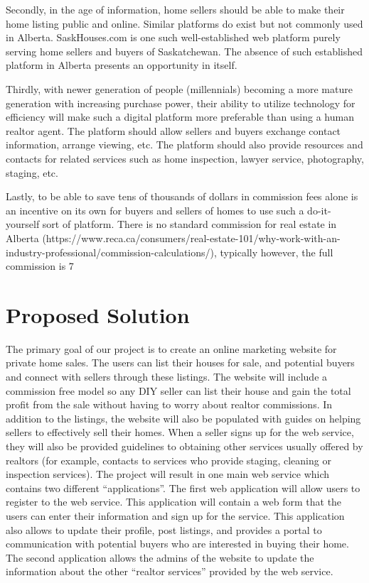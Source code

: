 \documentclass[letterpaper,12pt]{article}
\begin{document}
Secondly, in the age of information, home sellers should be able to make their home listing public and online. Similar platforms do exist but not commonly used in Alberta. SaskHouses.com is one such well-established web platform purely serving home sellers and buyers of Saskatchewan. The absence of such established platform in Alberta presents an opportunity in itself. 

Thirdly, with newer generation of people (millennials) becoming a more mature generation with increasing purchase power, their ability to utilize technology for efficiency will make such a digital platform more preferable than using a human realtor agent. The platform should allow sellers and buyers exchange contact information, arrange viewing, etc. The platform should also provide resources and contacts for related services such as home inspection, lawyer service, photography, staging, etc.

Lastly, to be able to save tens of thousands of dollars in commission fees alone is an incentive on its own for buyers and sellers of homes to use such a do-it-yourself sort of platform. There is no standard commission for real estate in Alberta (https://www.reca.ca/consumers/real-estate-101/why-work-with-an-industry-professional/commission-calculations/), typically however, the full commission is 7%


\section{Proposed Solution}

The primary goal of our project is to create an online marketing website for private home sales. The users can list their houses for sale, and potential buyers and connect with sellers through these listings. The website will include a commission free model so any DIY seller can list their house and gain the total profit from the sale without having to worry about realtor commissions. In addition to the listings, the website will also be populated with guides on helping sellers to effectively sell their homes. When a seller signs up for the web service, they will also be provided guidelines to obtaining other services usually offered by realtors (for example, contacts to services who provide staging, cleaning or inspection services).
The project will result in one main web service which contains two different “applications”. The first web application will allow users to register to the web service. This application will contain a web form that the users can enter their information and sign up for the service. This application also allows to update their profile, post listings, and provides a portal to communication with potential buyers who are interested in buying their home. The second application allows the admins of the website to update the information about the other “realtor services” provided by the web service.
\end{document}
